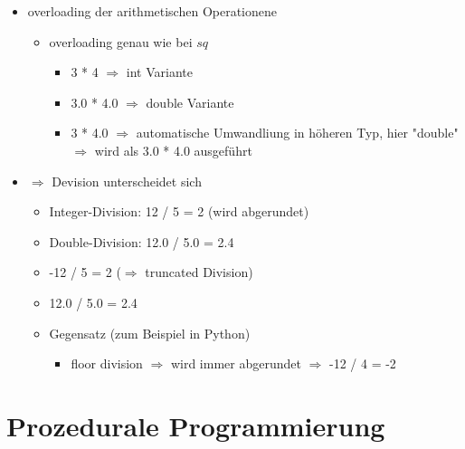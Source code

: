 \documentclass[a4paper]{scrartcl}
\begin{document}
\begin{itemize}
\begin{itemize}
\begin{itemize}
\begin{itemize}
\begin{verbatim}
#include <string>
int main() {
	std::cout << "Hello, world!" << std::endl;
	std::string out = "mein erstes Programm\n";
	std::cout << out;
	return 0;
}
\end{verbatim}
\end{itemize}
\end{itemize}
\item overloading der arithmetischen Operationene
\begin{itemize}
\item overloading genau wie bei $sq$
\begin{itemize}
\item 3 * 4 $\Rightarrow$ int Variante
\item 3.0 * 4.0 $\Rightarrow$ double Variante
\item 3 * 4.0 $\Rightarrow$ automatische Umwandliung in höheren Typ, hier "double" $\Rightarrow$ wird als 3.0 * 4.0 ausgeführt
\end{itemize}
\end{itemize}
\item $\Rightarrow$ Devision unterscheidet sich
\begin{itemize}
\item Integer-Division: 12 / 5 = 2 (wird abgerundet)
\item Double-Division: 12.0 / 5.0 = 2.4
\item -12 / 5 = 2 ($\Rightarrow$ truncated Division)
\item 12.0 / 5.0 = 2.4
\item Gegensatz (zum Beispiel in Python)
\begin{itemize}
\item floor division $\Rightarrow$ wird immer abgerundet $\Rightarrow$ -12 / 4 = -2
\end{itemize}
\end{itemize}
\end{itemize}
\end{itemize}
\section{Prozedurale Programmierung}
\label{sec-8}
\end{document}
